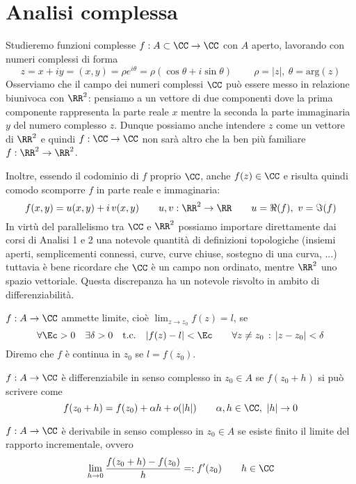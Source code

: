 
\chapter{Analisi complessa}

Studieremo funzioni complesse $f : A\subset\CC\rightarrow \CC$ con $A$ aperto, lavorando con numeri complessi di forma
\begin{equation*}
z = x + iy = (x, y) = \rho e^{i\theta} = \rho (\cos\theta + i\sin\theta)\qquad\ \rho=|z|,\ \theta=\text{arg}(z)
\end{equation*}
Osserviamo che il campo dei numeri complessi $\CC$ può essere messo in relazione
biunivoca con $\RR^2$: pensiamo a un vettore di due componenti dove la prima componente rappresenta la parte
reale $x$ mentre la seconda la parte immaginaria $y$ del numero complesso $z$. Dunque possiamo anche intendere $z$ come un vettore di $\RR^2$ e quindi $f:\CC\to\CC$ non sarà altro che la ben più familiare $f:\RR^2\to\RR^2$.

Inoltre, essendo il codominio di $f$ proprio $\CC$, anche $f(z)\in\CC$ e risulta quindi comodo scomporre $f$ in parte reale e immaginaria:
$$
f(x,y)=u(x,y)+i\,v(x,y)\qquad u,v:\RR^2\to\RR \qquad u=\Re(f),\ v=\Im(f)
$$
In virtù del parallelismo tra $\CC$ e $\RR^2$ possiamo importare direttamente dai corsi di Analisi 1 e 2 una notevole quantità di definizioni topologiche (insiemi aperti, semplicementi connessi, curve, curve chiuse, sostegno di una curva, ...) tuttavia è bene ricordare che $\CC$ è un campo non ordinato, mentre $\RR^2$ uno spazio vettoriale. Questa discrepanza ha un notevole risvolto in ambito di differenziabilità.

\begin{defn}
$f:A\to\CC$ ammette limite, cioè $\displaystyle\lim_{z\to z_0}f(z)=l$, se
$$
\forall\Ec>0\quad\exists\delta>0\quad\text{t.c.}\quad |f(z)-l|<\Ec \quad\quad \forall z\neq z_0\,:\,|z-z_0|<\delta
$$
Diremo che $f$ è continua in $z_0$ se $l=f(z_0)$. 
\end{defn}

\begin{defn}
$f:A\to\CC$ è differenziabile in senso complesso in $z_0\in A$ se $f(z_0 + h)$ si può scrivere come
\begin{equation*}
f(z_0 + h) = f(z_0) + \alpha h + o(|h|)\qquad \alpha,h\in\CC,\ |h|\to 0
\end{equation*}
\end{defn}

\begin{defn}
$f:A\to\CC$ è derivabile in senso complesso in $z_0\in A$ se esiste finito il limite del rapporto incrementale, ovvero
\begin{equation*}
\lim_{h\to 0}\frac{f(z_0 + h) - f(z_0)}{h}=:f'(z_0)\qquad h\in\CC
\end{equation*}
\end{defn}

